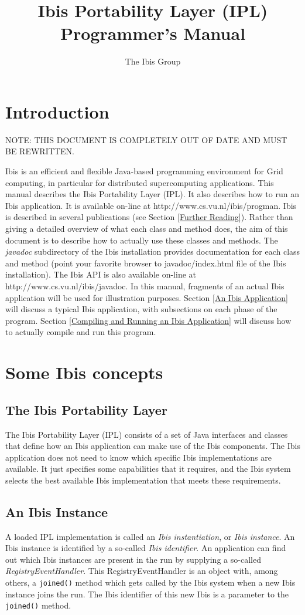 \documentclass[10pt]{article}
\newcommand{\mysection}[1]{\section{#1}\label{#1}}
\newcommand{\mysubsection}[1]{\subsection{#1}\label{#1}}
\begin{document}
\title{Ibis Portability Layer (IPL) Programmer's Manual}

\author{The Ibis Group}

\maketitle

\section{Introduction}

NOTE: THIS DOCUMENT IS COMPLETELY OUT OF DATE AND MUST BE REWRITTEN.

Ibis is an efficient and flexible Java-based programming environment for Grid
computing, in particular for distributed supercomputing applications.
This manual describes the Ibis Portability Layer (IPL). It also describes
how to run an Ibis application.
It is available on-line at http://www.cs.vu.nl/ibis/progman.
Ibis is described in several publications (see Section \ref{Further Reading}).
Rather than giving a detailed overview of what each class and method does,
the aim of this document is to describe how to actually use these classes
and methods.
The \emph{javadoc} subdirectory of the Ibis installation provides
documentation for each class and method (point your favorite browser
to javadoc/index.html file of the Ibis installation).
The Ibis API is also available
on-line at http://www.cs.vu.nl/ibis/javadoc.
In this manual, fragments of an actual Ibis application will be used for
illustration purposes.
Section \ref{An Ibis Application} will discuss a typical Ibis application,
with subsections on each phase of the program.
Section \ref{Compiling and Running an Ibis Application} will discuss how to
actually compile and run this program.

\mysection{Some Ibis concepts}

\mysubsection{The Ibis Portability Layer}

The Ibis Portability Layer (IPL) consists of a set of Java interfaces and
classes that define how an Ibis application can make use of the Ibis components.
The Ibis application does not need to know which specific Ibis implementations
are available.
It just specifies some capabilities that it requires, and the Ibis system
selects the best available Ibis implementation that meets these requirements.
 
\mysubsection{An Ibis Instance}

A loaded IPL implementation is called an \emph{Ibis instantiation}, or 
\emph{Ibis instance}.
An Ibis instance is identified by a so-called
\emph{Ibis identifier}.
An application can find out which Ibis instances are present in the run
by supplying a so-called \emph{RegistryEventHandler}.
This RegistryEventHandler is an object with, among others, a \texttt{joined()}
method which gets called by the Ibis system when a new Ibis instance
joins the run.  The Ibis identifier of this new Ibis is a parameter
to the \texttt{joined()} method.
\end{document}
